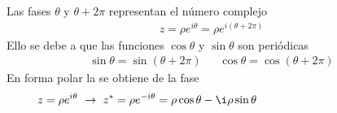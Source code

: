 \documentclass[letterpaper,10pt,english]{jupyterBook}
\begin{document}
\sphinxAtStartPar
Las fases \(\theta\) y \(\theta+ 2\pi\) representan el  número complejo
\begin{equation*}
\begin{split}
z = \rho e^{i\theta} = \rho e^{i(\theta + 2\pi)} 
\end{split}
\end{equation*}
\sphinxAtStartPar
Ello se debe a que las funciones \(\cos \theta\) y \(\sin\theta\) son periódicas
\begin{equation*}
\begin{split}
\sin\theta  = \sin(\theta + 2\pi)~~~~~~~\cos\theta  = \cos(\theta +2\pi)
\end{split}
\end{equation*}
\sphinxAtStartPar
En forma polar la  se obtiene  de la fase
\begin{equation*}
\begin{split}
z = \rho e^{i\theta} ~\rightarrow ~z^* = \rho e^{-i\theta} = \rho \cos\theta - \i \rho \sin\theta \hspace{4cm}
\end{split}
\end{equation*}
\end{document}
